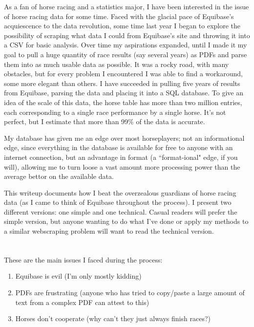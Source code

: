 \documentclass{article}
\begin{document}
As a fan of horse racing and a statistics major, I have been interested in the issue of horse racing data for some time. Faced with the glacial pace of Equibase's acquiescence to the data revolution, some time last year I began to explore the possibility of scraping what data I could from Equibase's site and throwing it into a CSV for basic analysis. Over time my aspirations expanded, until I made it my goal to pull a huge quantity of race results (say several years) as PDFs and parse them into as much usable data as possible. It was a rocky road, with many obstacles, but for every problem I encountered I was able to find a workaround, some more elegant than others. I have succeeded in pulling five years of results from Equibase, parsing the data and placing it into a SQL database. To give an idea of the scale of this data, the horse table has more than two million entries, each corresponding to a single race performance by a single horse. It's not perfect, but I estimate that more than 99\% of the data is accurate.

My database has given me an edge over most horseplayers; not an informational edge, since everything in the database is available for free to anyone with an internet connection, but an advantage in format (a ``format-ional" edge, if you will), allowing me to turn loose a vast amount more processing power than the average bettor on the available data.

This writeup documents how I beat the overzealous guardians of horse racing data (as I came to think of Equibase throughout the process). I present two different versions: one simple and one technical. Casual readers will prefer the simple version, but anyone wanting to do what I've done or apply my methods to a similar webscraping problem will want to read the technical version.

\section*{}

\noindent These are the main issues I faced during the process:
\begin{enumerate}
  \item Equibase is evil (I'm only mostly kidding)
  \item PDFs are frustrating (anyone who has tried to copy/paste a large amount of text from a complex PDF can attest to this)
  \item Horses don't cooperate (why can't they just always finish races?)
\end{enumerate}
\end{document}
